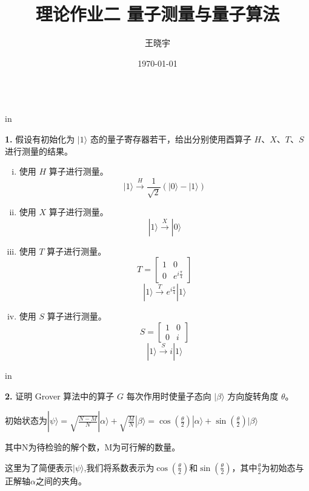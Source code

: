 \documentclass[11pt]{article}
\begin{document}
\title{{\bf 理论作业二 \quad 量子测量与量子算法}}
\author{王晓宇 }
\date{\today}
\maketitle

\begin{tabular*}{13cm}{r}
\hline
\end{tabular*}

 in

{\bf 1.} 假设有初始化为 $|1\rangle$ 态的量子寄存器若干，给出分别使用酉算子 $H$、$X$、$T$、$S$ 进行测量的结果。

\begin{enumerate}[i.]
    \item 使用 $H$ 算子进行测量。
        \[|1\rangle \stackrel{H}\longrightarrow  \frac{1}{\sqrt{2}}\left( |0\rangle - |1\rangle\right)\]
    \item 使用 $X$ 算子进行测量。
        \[|1\rangle \stackrel{X}\longrightarrow  |0\rangle\]
    \item 使用 $T$ 算子进行测量。
        \[T = 
        \begin{bmatrix}
            1 & 0 \\
            0 & e^{i\frac{\pi}{4}}    
        \end{bmatrix}\]
        \[|1\rangle \stackrel{T}\longrightarrow  e^{i\frac{\pi}{4}}|1\rangle \]
    \item 使用 $S$ 算子进行测量。
        \[S = 
        \begin{bmatrix}
            1 & 0 \\
            0 & i    
        \end{bmatrix}\]
        \[|1\rangle \stackrel{S}\longrightarrow  i |1\rangle \]
\end{enumerate}


 in

{\bf 2.} 证明 Grover 算法中的算子 $G$ 每次作用时使量子态向 $|\beta\rangle$ 方向旋转角度 $\theta$。







初始状态为$|\psi\rangle = \sqrt{\frac{N-M}{N}}|\alpha\rangle + \sqrt{\frac{M}{N}} |\beta\rangle= \cos(\frac{\theta}{2}) |\alpha\rangle + \sin(\frac{\theta}{2}) |\beta\rangle$

其中N为待检验的解个数，M为可行解的数量。

这里为了简便表示$|\psi\rangle$,我们将系数表示为$\cos(\frac{\theta}{2})$和$\sin(\frac{\theta}{2})$，其中$\frac{\theta}{2}$为初始态与正解轴$\alpha$之间的夹角。
\end{document}
